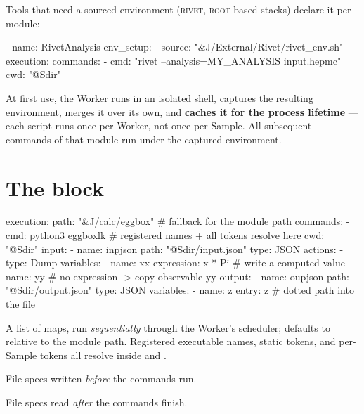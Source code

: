 Tools that need a sourced environment (\textsc{rivet}, \textsc{root}-based stacks)
declare it per module:

\begin{yamlwin}
- name: RivetAnalysis
  env_setup:
    - source: "&J/External/Rivet/rivet_env.sh"
  execution:
    commands:
      - cmd: "rivet --analysis=MY_ANALYSIS input.hepmc"
        cwd: "@Sdir"
\end{yamlwin}

At first use, the Worker runs  in an isolated shell,
captures the resulting environment, merges it over its own, and \textbf{caches it for the
process lifetime} --- each script runs once per Worker, not once per Sample. All
subsequent commands of that module run under the captured environment.

\section{The  block}
\label{sec:execution-block}

\begin{yamlwin}
execution:
  path: "&J/calc/eggbox"       # fallback for the module path
  commands:
    - cmd: python3 eggboxlk    # registered names + all tokens resolve here
      cwd: "@Sdir"
  input:
    - name: inpjson
      path: "@Sdir/input.json"
      type: JSON
      actions:
        - type: Dump
          variables:
            - name: xx
              expression: x * Pi     # write a computed value
            - name: yy               # no expression -> copy observable yy
  output:
    - name: oupjson
      path: "@Sdir/output.json"
      type: JSON
      variables:
        - name: z
          entry: z                   # dotted path into the file
\end{yamlwin}

\begin{keylist}
  \item[commands] A list of  maps, run \emph{sequentially} through
        the Worker's scheduler;  defaults to  relative to the
        module path. Registered executable names, static tokens, and per-Sample tokens
        all resolve inside  and .
  \item[input] File specs written \emph{before} the commands run.
  \item[output] File specs read \emph{after} the commands finish.
\end{keylist}

